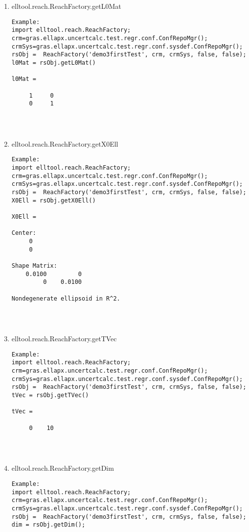 \begin{enumerate}
\begin{lstlisting}
\end{lstlisting}
\fontfamily{\familydefault}
\selectfont
\item {elltool.reach.ReachFactory.getL0Mat}
\selectfont
\begin{lstlisting}
Example:
import elltool.reach.ReachFactory;
crm=gras.ellapx.uncertcalc.test.regr.conf.ConfRepoMgr();
crmSys=gras.ellapx.uncertcalc.test.regr.conf.sysdef.ConfRepoMgr();
rsObj =  ReachFactory('demo3firstTest', crm, crmSys, false, false);
l0Mat = rsObj.getL0Mat()

l0Mat =

     1     0
     0     1




\end{lstlisting}
\fontfamily{\familydefault}
\selectfont
\item {elltool.reach.ReachFactory.getX0Ell}
\selectfont
\begin{lstlisting}
Example:
import elltool.reach.ReachFactory;
crm=gras.ellapx.uncertcalc.test.regr.conf.ConfRepoMgr();
crmSys=gras.ellapx.uncertcalc.test.regr.conf.sysdef.ConfRepoMgr();
rsObj =  ReachFactory('demo3firstTest', crm, crmSys, false, false);
X0Ell = rsObj.getX0Ell()

X0Ell =

Center:
     0
     0

Shape Matrix:
    0.0100         0
         0    0.0100

Nondegenerate ellipsoid in R^2.




\end{lstlisting}
\fontfamily{\familydefault}
\selectfont
\item {elltool.reach.ReachFactory.getTVec}
\selectfont
\begin{lstlisting}
Example:
import elltool.reach.ReachFactory;
crm=gras.ellapx.uncertcalc.test.regr.conf.ConfRepoMgr();
crmSys=gras.ellapx.uncertcalc.test.regr.conf.sysdef.ConfRepoMgr();
rsObj =  ReachFactory('demo3firstTest', crm, crmSys, false, false);
tVec = rsObj.getTVec()

tVec =

     0    10




\end{lstlisting}
\fontfamily{\familydefault}
\selectfont
\item {elltool.reach.ReachFactory.getDim}
\selectfont
\begin{lstlisting}
Example:
import elltool.reach.ReachFactory;
crm=gras.ellapx.uncertcalc.test.regr.conf.ConfRepoMgr();
crmSys=gras.ellapx.uncertcalc.test.regr.conf.sysdef.ConfRepoMgr();
rsObj =  ReachFactory('demo3firstTest', crm, crmSys, false, false);
dim = rsObj.getDim();





\end{lstlisting}
\end{enumerate}
